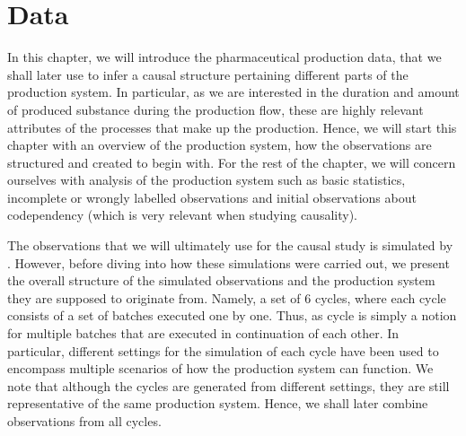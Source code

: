 \documentclass[../Thesis.tex]{subfiles}
\begin{document}
\chapter{Data}\label{chap:data}
In this chapter, we will introduce the pharmaceutical production data, that we shall later use to infer a causal structure pertaining different parts of the production system. In particular, as we are interested in the duration and amount of produced substance during the production flow, these are highly relevant attributes of the processes that make up the production. Hence, we will start this chapter with an overview of the production system, how the observations are structured and created to begin with. For the rest of the chapter, we will concern ourselves with analysis of the production system such as basic statistics, incomplete or wrongly labelled observations and initial observations about codependency (which is very relevant when studying causality).

The observations that we will ultimately use for the causal study is simulated by \cite{benchmark-model-to-generate-batch-process-data}. However, before diving into how these simulations were carried out, we present the overall structure of the simulated observations and the production system they are supposed to originate from. Namely, a set of $6$ cycles, where each cycle consists of a set of batches executed one by one. Thus, as cycle is simply a notion for multiple batches that are executed in continuation of each other. In particular, different settings for the simulation of each cycle have been used to encompass multiple scenarios of how the production system can function. We note that although the cycles are generated from different settings, they are still representative of the same production system. Hence, we shall later combine observations from all cycles.
\end{document}
